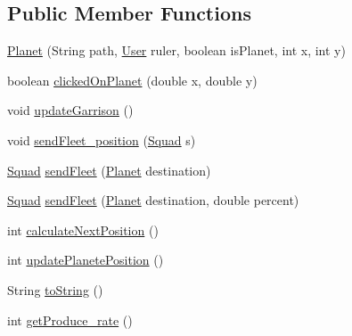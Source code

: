 \subsection*{Public Member Functions}
\begin{DoxyCompactItemize}
\item 
\hyperlink{classfr_1_1projet_1_1groupe40_1_1model_1_1board_1_1_planet_a14689f4495bcea6d743ba108432ce1a8}{Planet} (String path, \hyperlink{classfr_1_1projet_1_1groupe40_1_1client_1_1_user}{User} ruler, boolean is\+Planet, int x, int y)
\item 
boolean \hyperlink{classfr_1_1projet_1_1groupe40_1_1model_1_1board_1_1_planet_a89e66ac5ae9ed1186e289c51d5b84140}{clicked\+On\+Planet} (double x, double y)
\item 
void \hyperlink{classfr_1_1projet_1_1groupe40_1_1model_1_1board_1_1_planet_ab5f4d299a664ad3b73eb6c6449530fcc}{update\+Garrison} ()
\item 
void \hyperlink{classfr_1_1projet_1_1groupe40_1_1model_1_1board_1_1_planet_a971751ad9b3ed76f22c7f5e21e8d0e18}{send\+Fleet\+\_\+position} (\hyperlink{classfr_1_1projet_1_1groupe40_1_1model_1_1ships_1_1_squad}{Squad} s)
\item 
\hyperlink{classfr_1_1projet_1_1groupe40_1_1model_1_1ships_1_1_squad}{Squad} \hyperlink{classfr_1_1projet_1_1groupe40_1_1model_1_1board_1_1_planet_a84ef56833b5c5d7a4f4cbaecb2e8287f}{send\+Fleet} (\hyperlink{classfr_1_1projet_1_1groupe40_1_1model_1_1board_1_1_planet}{Planet} destination)
\item 
\hyperlink{classfr_1_1projet_1_1groupe40_1_1model_1_1ships_1_1_squad}{Squad} \hyperlink{classfr_1_1projet_1_1groupe40_1_1model_1_1board_1_1_planet_a66902570652946640bd36f78ec2a3038}{send\+Fleet} (\hyperlink{classfr_1_1projet_1_1groupe40_1_1model_1_1board_1_1_planet}{Planet} destination, double percent)
\item 
int \hyperlink{classfr_1_1projet_1_1groupe40_1_1model_1_1board_1_1_planet_a112910341d9f36d240ca4dbe961ba5fa}{calculate\+Next\+Position} ()
\item 
int \hyperlink{classfr_1_1projet_1_1groupe40_1_1model_1_1board_1_1_planet_a6964d033e72c629b179e917e0e0af896}{update\+Planete\+Position} ()
\item 
String \hyperlink{classfr_1_1projet_1_1groupe40_1_1model_1_1board_1_1_planet_adcf992792e929522ab2f15dc1eed7896}{to\+String} ()
\item 
int \hyperlink{classfr_1_1projet_1_1groupe40_1_1model_1_1board_1_1_planet_a1cc71a77c0d00ca3dca08e3789791f5d}{get\+Produce\+\_\+rate} ()

\end{DoxyCompactItemize}
